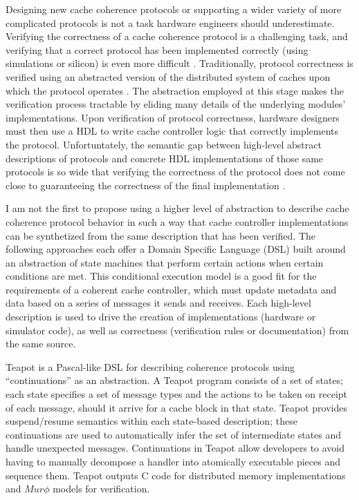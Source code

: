 Designing new cache coherence protocols or supporting a wider variety of more complicated protocols is not a task hardware engineers should underestimate.
Verifying the correctness of a cache coherence protocol is a challenging task, and
verifying that a correct protocol has been implemented correctly (using simulations or silicon) is even more difficult
\cite{deorio2008post, bentley2001validating, burckhardt2005verifying, clarke1995verification, dill1992protocol, wood1990verifying}.
Traditionally, protocol correctness is verified using an abstracted version of the distributed system of caches upon which the protocol operates
\cite{talupur2008going, delzanno2003constraint, pong1997verification, wood1990verifying, mcmillan2001parameterized}.
The abstraction employed at this stage makes the verification process tractable by eliding many details of the underlying modules' implementations.
Upon verification of protocol correctness, hardware designers must then use a HDL to write cache controller logic that correctly implements the protocol.
Unfortuntately, the semantic gap between high-level abstract descriptions of protocols and 
concrete HDL implementations of those same protocols is so wide that verifying the correctness of the protocol
does not come close to guaranteeing the correctness of the final implementation \cite{dave-memocode05}.

I am not the first to propose using a higher level of abstraction to describe cache coherence protocol behavior
in such a way that cache controller implementations can be synthetized from the same description that has been verified.
The following approaches each offer a Domain Specific Language (DSL)
built around an abstraction of state machines that perform certain actions when certain conditions are met.
This conditional execution model is a good fit for the requirements of a coherent cache controller,
which must update metadata and data based on a series of messages it sends and receives.
Each high-level description is used to drive the creation of implementations (hardware or simulator code),
as well as correctness (verification rules or documentation) from the same source.

Teapot \cite{chandra-dsl97, chandra-sigplan96}
is a Pascal-like DSL for describing coherence protocols using ``continuations'' as an abstraction.
A Teapot program consists of a set of states; each state
specifies a set of message types and the actions to be
taken on receipt of each message, should it arrive for a
cache block in that state.
Teapot provides suspend/resume semantics within each state-based description;
these continuations are used to automatically infer the set of intermediate states and handle unexpected messages.
Continuations in Teapot allow developers to avoid having to manually decompose
a handler into atomically executable pieces and sequence them. 
Teapot outputs C code for distributed memory implementations and $Mur\phi$ models for verification.


